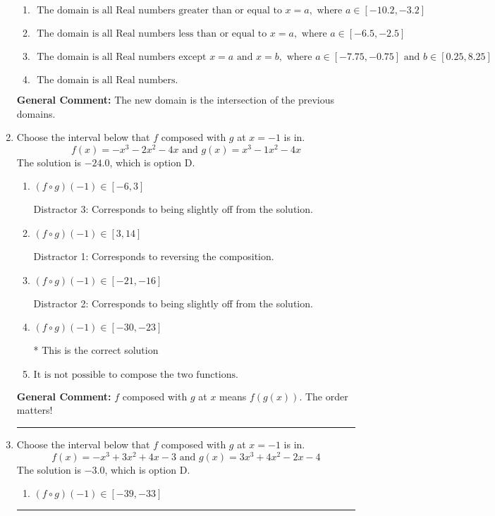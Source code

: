 \documentclass{extbook}[14pt]
\newcommand{\litem}[1]{\item #1

\rule{\textwidth}{0.4pt}}
\begin{document}
\begin{enumerate}
{\begin{enumerate}[label=\Alph*.]
\item \( \text{ The domain is all Real numbers greater than or equal to } x = a, \text{ where } a \in [-10.2, -3.2] \)


\item \( \text{ The domain is all Real numbers less than or equal to } x = a, \text{ where } a \in [-6.5, -2.5] \)


\item \( \text{ The domain is all Real numbers except } x = a \text{ and } x = b, \text{ where } a \in [-7.75, -0.75] \text{ and } b \in [0.25, 8.25] \)


\item \( \text{ The domain is all Real numbers. } \)


\end{enumerate}

\textbf{General Comment:} The new domain is the intersection of the previous domains.
}
\litem{
Choose the interval below that $f$ composed with $g$ at $x=-1$ is in.
\[ f(x) = -x^{3} -2 x^{2} -4 x \text{ and } g(x) = x^{3} -1 x^{2} -4 x \]The solution is \( -24.0 \), which is option D.\begin{enumerate}[label=\Alph*.]
\item \( (f \circ g)(-1) \in [-6, 3] \)

 Distractor 3: Corresponds to being slightly off from the solution.
\item \( (f \circ g)(-1) \in [3, 14] \)

 Distractor 1: Corresponds to reversing the composition.
\item \( (f \circ g)(-1) \in [-21, -16] \)

 Distractor 2: Corresponds to being slightly off from the solution.
\item \( (f \circ g)(-1) \in [-30, -23] \)

* This is the correct solution
\item \( \text{It is not possible to compose the two functions.} \)


\end{enumerate}

\textbf{General Comment:} $f$ composed with $g$ at $x$ means $f(g(x))$. The order matters!
}
\litem{
Choose the interval below that $f$ composed with $g$ at $x=-1$ is in.
\[ f(x) = -x^{3} +3 x^{2} +4 x -3 \text{ and } g(x) = 3x^{3} +4 x^{2} -2 x -4 \]The solution is \( -3.0 \), which is option D.\begin{enumerate}[label=\Alph*.]
\item \( (f \circ g)(-1) \in [-39, -33] \)


\end{enumerate}}
\end{enumerate}
\end{document}
